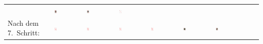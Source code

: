 \begin{tabular}{m{30mm}m{11mm}m{11mm}m{11mm}m{11mm}m{11mm}m{11mm}m{11mm}m{11mm}}
&
\includegraphics[width=0.08\textwidth]{./inf/SEKII/19_Java_Sortierverfahren/KaroDame.png}
&
\includegraphics[width=0.08\textwidth]{./inf/SEKII/19_Java_Sortierverfahren/KaroKoenig.png}
&
\includegraphics[width=0.08\textwidth]{./inf/SEKII/19_Java_Sortierverfahren/KaroAs.png}
\\
Nach dem 7.\ Schritt: &
\includegraphics[width=0.08\textwidth]{./inf/SEKII/19_Java_Sortierverfahren/Karo7.png}
&
\includegraphics[width=0.08\textwidth]{./inf/SEKII/19_Java_Sortierverfahren/Karo8.png}
&
\includegraphics[width=0.08\textwidth]{./inf/SEKII/19_Java_Sortierverfahren/Karo9.png}
&
\includegraphics[width=0.08\textwidth]{./inf/SEKII/19_Java_Sortierverfahren/Karo10.png}
&
\includegraphics[width=0.08\textwidth]{./inf/SEKII/19_Java_Sortierverfahren/KaroBube.png}
&
\includegraphics[width=0.08\textwidth]{./inf/SEKII/19_Java_Sortierverfahren/KaroDame.png}

\end{tabular}

